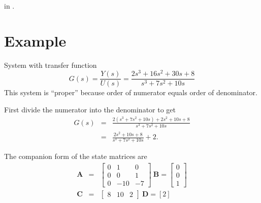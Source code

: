 in .
\begin{slide}\label{slide:proper}
\end{slide}


\section*{Example}

\begin{slide}
System with transfer function
\[G(s)=\frac{Y(s)}{U(s)}=\frac{2s^3 + 16s^2 + 30s + 8}{s^3 + 7s^2 + 10s}\]
This system is ``proper'' because order of numerator equals order of denominator.
\end{slide}
\begin{slide}
First divide the numerator into the denominator to get
\begin{eqnarray*}G(s)&=&\frac{2(s^3 + 7s^2 + 10s) + 2s^2 + 10s + 8}{s^3 + 7s^2 +
10s}\\ &=& \frac{2s^2 + 10s + 8}{s^3 + 7s^2 + 10s} +
2.\end{eqnarray*} 
\end{slide}
\begin{slide}
The companion form of the state matrices are
\begin{eqnarray*}\mathbf{A} & = & \left[\begin{array}{ccc}
  0 & 1 & 0 \\
  0 & 0 & 1 \\
  0 & -10 & -7
\end{array}\right]\ \mathbf{B}=\left[\begin{array}{c}
  0 \\
  0 \\
  1
\end{array}\right]\\ \mathbf{C} & = & \left[\begin{array}{ccc}
  8 & 10 & 2
\end{array}\right]\ \mathbf{D}=\left[2\right]\end{eqnarray*}
\end{slide}

